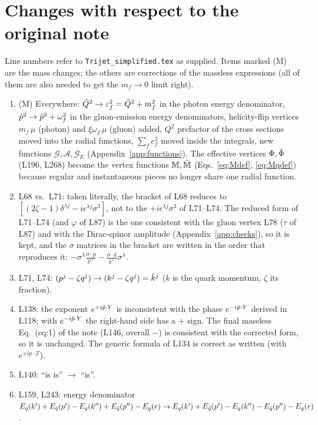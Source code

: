 \documentclass[9pt]{article}
\newcommand{\eps}{\varepsilon_{f}}           %
\newcommand{\om}{\omega_{f}}                 %
\newcommand{\GE}{\mathcal{G}_{E}}            %
\newcommand{\M}{\mathbb{M}}
\newcommand{\Mq}{\Tilde{\mathbb{M}}}
\numberwithin{equation}{section}
\begin{document}
\section{Changes with respect to the original note}\label{app:changes}
Line numbers refer to \texttt{Trijet\_simplified.tex} as supplied. Items marked (M) are the mass changes; the others are corrections of the massless expressions (all of them are also needed to get the $m_{f}\rightarrow 0$ limit right).
\begin{enumerate}
    \item (M) Everywhere: $\Tilde{Q}^{2}\rightarrow\eps^{2}=\Tilde{Q}^{2}+m^{2}_{f}$ in the photon energy denominator, $\Tilde{p}^{2}\rightarrow\Tilde{p}^{2}+\om^{2}$ in the gluon-emission energy denominators, helicity-flip vertices $m_{f}\,\mu$ (photon) and $\xi\om\,\mu$ (gluon) added, $Q^{2}$ prefactor of the cross sections moved into the radial functions, $\sum_{f}e^{2}_{f}$ moved inside the integrals, new functions $\mathcal{G},\mathcal{A},\GE$ (Appendix~\ref{app:functions}). The effective vertices $\Phi,\Tilde{\Phi}$ (L196, L268) become the vertex functions $\M,\Mq$ (Eqs.~\eqref{eq:Mdef}, \eqref{eq:Mqdef}) because regular and instantaneous pieces no longer share one radial function.
    \item L68 vs.\ L71: taken literally, the bracket of L68 reduces to $[(2\zeta-1)\delta^{\lambda j}-i\epsilon^{\lambda j}\sigma^{3}]$, not to the $+i\epsilon^{\lambda j}\sigma^{3}$ of L71--L74. The reduced form of L71--L74 (and $\varphi$ of L87) is the one consistent with the gluon vertex L78 ($\tau$ of L87) and with the Dirac-spinor amplitude (Appendix~\ref{app:checks}), so it is kept, and the $\sigma$ matrices in the bracket are written in the order that reproduces it: $-\sigma^{\lambda}\frac{\sigma\cdot p}{p^{+}}-\frac{\sigma\cdot k}{k^{+}}\sigma^{\lambda}$.
    \item L71, L74: $(p^{j}-\zeta q^{j})\rightarrow(k^{j}-\zeta q^{j})=\Tilde{k}^{j}$ ($k$ is the quark momentum, $\zeta$ its fraction).
    \item L138: the exponent $e^{+i\Tilde{p}\cdot Y}$ is inconsistent with the phase $e^{-i\Tilde{p}\cdot Y}$ derived in L118; with $e^{-i\Tilde{p}\cdot Y}$ the right-hand side has a $+$ sign. The final massless Eq.~(eq:1) of the note (L146, overall $-$) is consistent with the corrected form, so it is unchanged. The generic formula of L134 is correct as written (with $e^{+ip\cdot Z}$).
    \item L140: ``is is'' $\rightarrow$ ``is''.
    \item L159, L243: energy denominator $E_{q}(k')+E_{\Bar{q}}(p')-E_{q}(k'')+E_{\Bar{q}}(p'')-E_{g}(r)\rightarrow E_{q}(k')+E_{\Bar{q}}(p')-E_{q}(k'')-E_{\Bar{q}}(p'')-E_{g}(r)$.

\end{enumerate}
\end{document}
